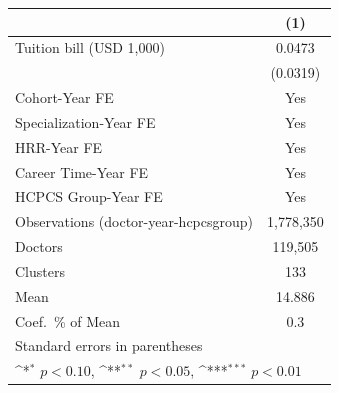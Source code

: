 {
\def\sym#1{\ifmmode^{#1}\else\(^{#1}\)\fi}
\begin{tabular}{l*{1}{c}}
\hline\hline
                    &\multicolumn{1}{c}{(1)}         \\
\hline
Tuition bill (USD 1,000)&      0.0473         \\
                    &    (0.0319)         \\
[1em]
Cohort-Year FE      &         Yes         \\
[1em]
Specialization-Year FE&         Yes         \\
[1em]
HRR-Year FE         &         Yes         \\
[1em]
Career Time-Year FE &         Yes         \\
[1em]
HCPCS Group-Year FE &         Yes         \\
\hline
Observations (doctor-year-hcpcsgroup)&   1,778,350         \\
Doctors             &     119,505         \\
Clusters            &         133         \\
Mean                &      14.886         \\
Coef.\ \% of Mean   &         0.3         \\
\hline\hline
\multicolumn{2}{l}{\footnotesize Standard errors in parentheses}\\
\multicolumn{2}{l}{\footnotesize \sym{*} \(p<0.10\), \sym{**} \(p<0.05\), \sym{***} \(p<0.01\)}\\
\end{tabular}
}
